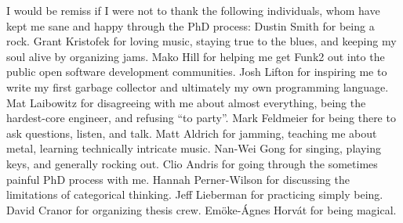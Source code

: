 I would be remiss if I were not to thank the following individuals,
whom have kept me sane and happy through the PhD process:
Dustin Smith for being a rock.
Grant Kristofek for loving music, staying true to the blues, and keeping my soul alive by organizing jams.
Mako Hill for helping me get Funk2 out into the public open software development communities.
Josh Lifton for inspiring me to write my first garbage collector and ultimately my own programming language.
Mat Laibowitz for disagreeing with me about almost everything, being the hardest-core engineer, and refusing ``to party''.
Mark Feldmeier for being there to ask questions, listen, and talk.
Matt Aldrich for jamming, teaching me about metal, learning technically intricate music.
Nan-Wei Gong for singing, playing keys, and generally rocking out.
Clio Andris for going through the sometimes painful PhD process with me.
Hannah Perner-Wilson for discussing the limitations of categorical thinking.
Jeff Lieberman for practicing simply being.
David Cranor for organizing thesis crew.
Em\"{o}ke-\'{A}gnes Horv\'{a}t for being magical.

\endgroup

